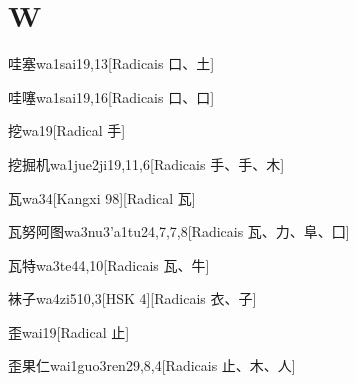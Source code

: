 
\section*{W}

\begin{entry}{哇塞}{wa1sai1}{9,13}[Radicais ⼝、⼟]
\end{entry}

\begin{entry}{哇噻}{wa1sai1}{9,16}[Radicais ⼝、⼝]
\end{entry}

\begin{entry}{挖}{wa1}{9}[Radical ⼿]
\end{entry}

\begin{entry}{挖掘机}{wa1jue2ji1}{9,11,6}[Radicais ⼿、⼿、⽊]
\end{entry}

\begin{entry}{瓦}{wa3}{4}[Kangxi 98][Radical ⽡]
\end{entry}

\begin{entry}{瓦努阿图}{wa3nu3'a1tu2}{4,7,7,8}[Radicais ⽡、⼒、⾩、⼞]
\end{entry}

\begin{entry}{瓦特}{wa3te4}{4,10}[Radicais ⽡、⽜]
\end{entry}

\begin{entry}{袜子}{wa4zi5}{10,3}[HSK 4][Radicais ⾐、⼦]
\end{entry}

\begin{entry}{歪}{wai1}{9}[Radical ⽌]
\end{entry}

\begin{entry}{歪果仁}{wai1guo3ren2}{9,8,4}[Radicais ⽌、⽊、⼈]
\end{entry}

